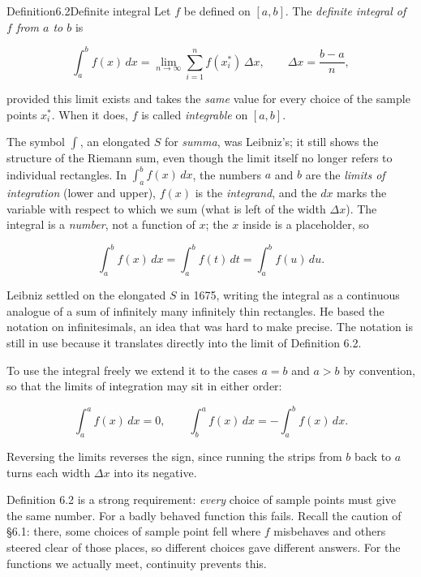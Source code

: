 \documentclass[a4paper,12pt,oneside]{memoir}
\begin{document}
\begin{envdefinition}{Definition}{6.2}{Definite integral}
Let \(f\) be defined on \([a, b]\). The \emph{definite integral of \(f\) from \(a\) to \(b\)} is

\[ \int_{a}^{b} f(x)\,dx = \lim_{n \to \infty} \sum_{i=1}^{n} f(x_{i}^{*})\,\Delta x, \qquad \Delta x = \frac{b - a}{n}, \]

provided this limit exists and takes the \emph{same} value for every choice of the sample points \(x_{i}^{*}\). When it does, \(f\) is called \emph{integrable} on \([a, b]\).
\end{envdefinition}
The symbol \(\int\), an elongated \(S\) for \emph{summa}, was Leibniz’s; it still shows the structure of the Riemann sum, even though the limit itself no longer refers to individual rectangles. In \(\displaystyle\int_{a}^{b} f(x)\,dx\), the numbers \(a\) and \(b\) are the \emph{limits of integration} (lower and upper), \(f(x)\) is the \emph{integrand}, and the \(dx\) marks the variable with respect to which we sum (what is left of the width \(\Delta x\)). The integral is a \emph{number}, not a function of \(x\); the \(x\) inside is a placeholder, so

\[ \int_{a}^{b} f(x)\,dx = \int_{a}^{b} f(t)\,dt = \int_{a}^{b} f(u)\,du. \]

Leibniz settled on the elongated \(S\) in 1675, writing the integral as a continuous analogue of a sum of infinitely many infinitely thin rectangles. He based the notation on infinitesimals, an idea that was hard to make precise. The notation is still in use because it translates directly into the limit of Definition 6.2.

To use the integral freely we extend it to the cases \(a = b\) and \(a > b\) by convention, so that the limits of integration may sit in either order:

\[ \int_{a}^{a} f(x)\,dx = 0, \qquad \int_{b}^{a} f(x)\,dx = -\int_{a}^{b} f(x)\,dx. \]

Reversing the limits reverses the sign, since running the strips from \(b\) back to \(a\) turns each width \(\Delta x\) into its negative.

Definition 6.2 is a strong requirement: \emph{every} choice of sample points must give the same number. For a badly behaved function this fails. Recall the caution of §6.1: there, some choices of sample point fell where \(f\) misbehaves and others steered clear of those places, so different choices gave different answers. For the functions we actually meet, continuity prevents this.
\end{document}
